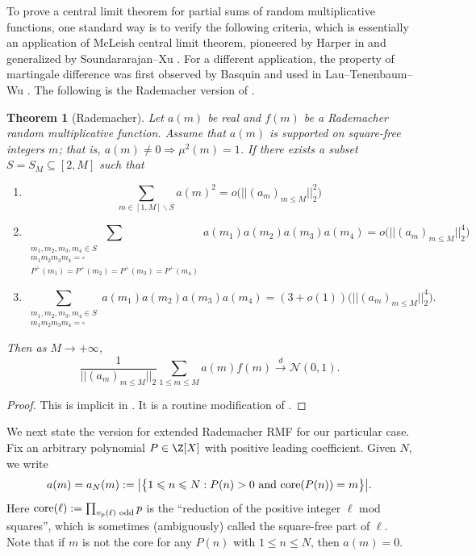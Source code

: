 \documentclass[reqno, 12pt]{amsart}
\theoremstyle{plain}
\newtheorem{theorem}{Theorem}[section]
\theoremstyle{definition}
\theoremstyle{remark}
\renewcommand{\le}{\leqslant}
\newcommand{\co}{\textnormal{core}}
\begin{document}
To prove a central limit theorem for partial sums of random multiplicative functions, one standard way is to verify the following criteria, which is essentially an application of McLeish central limit theorem, pioneered by Harper in \cite{Harper13}
and generalized by Soundararajan--Xu \cite[Theorem~3.1]{SX23}.
For a different application, the property of martingale difference was first observed by Basquin \cite{Basquin} and used in Lau--Tenenbaum--Wu \cite{LTW}. 
The following is the Rademacher version of \cite[Theorem~3.1]{SX23}.
\begin{theorem}[Rademacher]\label{thm: rad}
Let $a(m)$ be real and $f(m)$ be a Rademacher random multiplicative function.
Assume that $a(m)$ is supported on square-free integers $m$;
that is, $a(m)\ne 0\Rightarrow \mu^2(m)=1$.
If
there exists a subset $S=S_M\subseteq [2, M]$ such that 
    \begin{enumerate}
        \item \[\sum_{m\in [1, M] \smallsetminus S} a(m)^{2} = o\big(|| (a_m)_{m\le M} ||_2^2\big) \]
        \item \[\sum_{\substack{m_1, m_2, m_3, m_4 \in S \\ m_1m_2m_3m_4 =\square\\ P^{+}(m_1)=P^{+}(m_2) = P^{+}(m_3)=P^{+}(m_4)}}  a(m_1)a(m_2)a(m_3)a(m_4)  =  o \big( || (a_m)_{m\le M} ||_2^4 \big) \]
        \item \[\sum_{\substack{m_1, m_2, m_3, m_4 \in S \\ m_1m_2m_3m_4 =\square}}  a(m_1)a(m_2)a(m_3)a(m_4)  =  (3+o(1)) \big( || (a_m)_{m\le M} ||_2^4 \big) . \]
    \end{enumerate} 
    Then as $M\to +\infty$,
    \[ \frac{1}{   || (a_m)_{m\le M} ||_2   } \sum_{1\le m \le M} a(m) f(m) \xrightarrow[]{d} \mathcal{N}(0,1). \]
\end{theorem}


\begin{proof}
This is implicit in \cite[\S9]{SX23}.
It is a routine modification of \cite[Theorem~3.1]{SX23}.
\end{proof}

We next state the version for extended Rademacher RMF for our particular case. 
Fix an arbitrary polynomial $P\in \Z[X]$ with positive leading coefficient.
Given $N$, we write 
\begin{equation}
\label{core-fibers}
a(m) = a_N(m) : = \big|\big\{1\le n\le N: P(n)>0 \textnormal{ and } \co(P(n)) = m\big\}\big|. 
\end{equation}
Here $\co(\ell) := \prod_{v_p(\ell)\textnormal{ odd}} p$
is the ``reduction of the positive integer $\ell$ mod squares'',
which is sometimes (ambiguously) called the square-free part of $\ell$.
Note that if $m$ is not the core for any $P(n)$ with $1\le n \le N$, then $a(m)=0$. 
\end{document}
